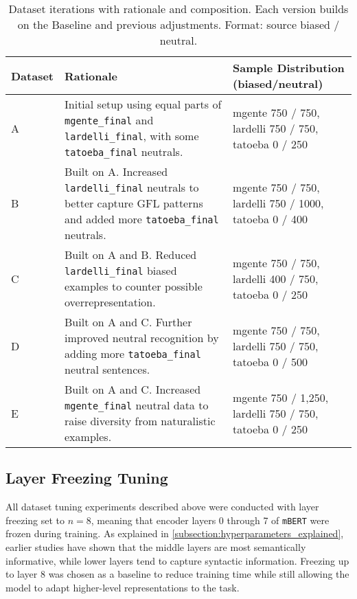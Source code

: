 \vspace{0.8em}
\begin{table}[ht]
    \centering
        \begin{tabularx}{\textwidth}{l X >{\raggedright\arraybackslash}X}
    \toprule
    \textbf{Dataset} & \textbf{Rationale} & \textbf{Sample Distribution (biased/neutral)} \\
    \midrule
    A & Initial setup using equal parts of \texttt{mgente\_final} and \texttt{lardelli\_final}, with some \texttt{tatoeba\_final} neutrals. & mgente 750 / 750, lardelli 750 / 750, tatoeba 0 / 250 \\
    B & Built on A. Increased \texttt{lardelli\_final} neutrals to better capture GFL patterns and added more \texttt{tatoeba\_final} neutrals. & mgente 750 / 750, lardelli 750 / 1000, tatoeba 0 / 400 \\
    C & Built on A and B. Reduced \texttt{lardelli\_final} biased examples to counter possible overrepresentation. & mgente 750 / 750, lardelli 400 / 750, tatoeba 0 / 250 \\
    D & Built on A and C. Further improved neutral recognition by adding more \texttt{tatoeba\_final} neutral sentences. & mgente 750 / 750, lardelli 750 / 750, tatoeba 0 / 500 \\
    E & Built on A and C. Increased \texttt{mgente\_final} neutral data to raise diversity from naturalistic examples. & mgente 750 / 1,250, lardelli 750 / 750, tatoeba 0 / 250 \\
    \bottomrule
    \end{tabularx}
    \caption[Dataset iterations with rationale and composition]{Dataset iterations with rationale and composition. Each version builds on the Baseline and previous adjustments. Format: source biased / neutral.}
    \label{tab:dataset_versions}
\end{table}


\subsection{Layer Freezing Tuning}
    All dataset tuning experiments described above were conducted with layer freezing set to $n=8$, meaning that encoder layers 0 through 7 of \texttt{mBERT} were frozen during training. As explained in \autoref{subsection:hyperparameters_explained}, earlier studies have shown that the middle layers are most semantically informative, while lower layers tend to capture syntactic information. Freezing up to layer 8 was chosen as a baseline to reduce training time while still allowing the model to adapt higher-level representations to the task.

